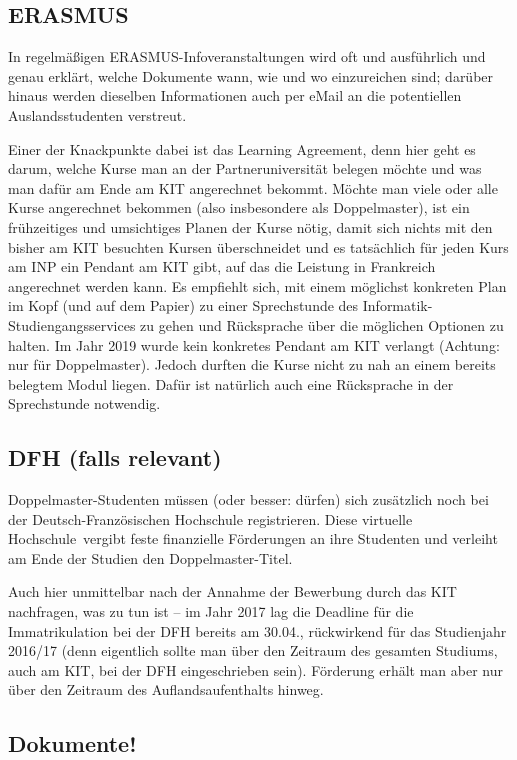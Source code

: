 \documentclass[11pt,a4paper]{article}
\begin{document}
	\subsection{ERASMUS}
	
	In regelmäßigen ERASMUS-Infoveranstaltungen wird oft und ausführlich und genau erklärt, welche Dokumente wann, wie und wo einzureichen sind; darüber hinaus werden dieselben Informationen auch per eMail an die potentiellen Auslandsstudenten verstreut. 
	
  Einer der Knackpunkte dabei ist das Learning Agreement, denn hier geht es darum, welche Kurse man an der Partneruniversität belegen möchte und was man dafür am Ende am KIT angerechnet bekommt. Möchte man viele oder alle Kurse angerechnet bekommen (also insbesondere als Doppelmaster), ist ein frühzeitiges und umsichtiges Planen der Kurse nötig, damit sich nichts mit den bisher am KIT besuchten Kursen überschneidet und es tatsächlich für jeden Kurs am INP ein Pendant am KIT gibt, auf das die Leistung in Frankreich angerechnet werden kann. Es empfiehlt sich, mit einem möglichst konkreten Plan im Kopf (und auf dem Papier) zu einer Sprechstunde des Informatik-Studiengangsservices zu gehen und Rücksprache über die möglichen Optionen zu halten. Im Jahr 2019 wurde kein konkretes Pendant am KIT verlangt (Achtung: nur für Doppelmaster). Jedoch durften die Kurse nicht zu nah an einem bereits belegtem Modul liegen. Dafür ist natürlich auch eine Rücksprache in der Sprechstunde notwendig.
	
	\subsection{DFH (falls relevant)}
	
	Doppelmaster-Studenten müssen (oder besser: dürfen) sich zusätzlich noch bei der Deutsch-Französischen Hochschule registrieren. Diese \glqq virtuelle Hochschule\grqq\ vergibt feste finanzielle Förderungen an ihre Studenten und verleiht am Ende der Studien den Doppelmaster-Titel. 
	
	Auch hier unmittelbar nach der Annahme der Bewerbung durch das KIT nachfragen, was zu tun ist -- im Jahr 2017 lag die Deadline für die Immatrikulation bei der DFH bereits am 30.04., rückwirkend für das Studienjahr 2016/17 (denn eigentlich sollte man über den Zeitraum des gesamten Studiums, auch am KIT, bei der DFH eingeschrieben sein). Förderung erhält man aber nur über den Zeitraum des Auflandsaufenthalts hinweg.
	
	\subsection{Dokumente!}
		
\end{document}
